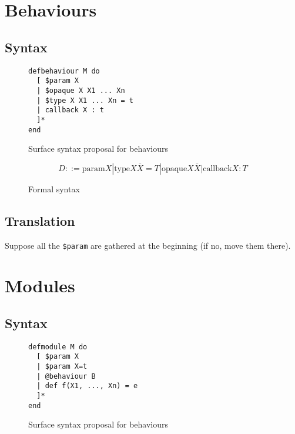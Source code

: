 \documentclass[a4paper,12pt]{article}
\author{Aghilas Y. Boussaa}
\begin{document}
\section{Behaviours}
\subsection{Syntax}
\begin{figure}[h]
\begin{verbatim}
defbehaviour M do
  [ $param X
  | $opaque X X1 ... Xn
  | $type X X1 ... Xn = t
  | callback X : t
  ]*
end
\end{verbatim}
\caption{Surface syntax proposal for behaviours}
\end{figure}
\begin{figure}[h]
  \[D::= \text{param} X | \text{type} X \overline{X} = T | \text{opaque} X
  \overline{X} | \text{callback} X:T
  \]
  \caption{Formal syntax}
\end{figure}
\subsection{Translation}
Suppose all the \texttt{\$param} are gathered at the beginning (if no, move them
there).
\section{Modules}
\subsection{Syntax}
\begin{figure}[h]
\begin{verbatim}
defmodule M do
  [ $param X
  | $param X=t
  | @behaviour B
  | def f(X1, ..., Xn) = e
  ]*
end
\end{verbatim}
\caption{Surface syntax proposal for behaviours}
\end{figure}
\end{document}
